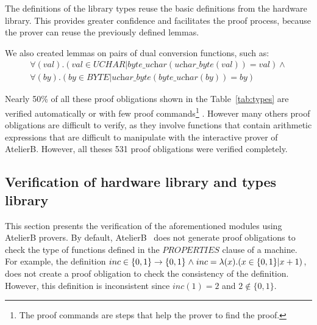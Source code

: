\documentclass[a4paper]{llncs}
\begin{document}
The definitions of the library types reuse the basic definitions from
the hardware library. This provides greater confidence and facilitates
the proof process, because the prover can reuse the previously defined
lemmas.


%

We also created lemmas on pairs of dual conversion functions, such as:
$$
 \begin{array}{l}
  \forall (val) . (val \in \textit{UCHAR} |
  \textit{byte\_uchar}(\textit{uchar\_byte}(val)) = val) \land\\
  \forall (by) . (by \in \textit{BYTE} |
  \textit{uchar\_byte}(\textit{byte\_uchar}(by)) = by)
 \end{array}
$$


Nearly 50\% of all these proof obligations shown in the
Table~\ref{tab:types} are verified automatically or with few proof
commands\footnote{The proof commands are steps that help the prover to find the proof.} .
However many others proof obligations are difficult to verify, as they involve functions
that contain arithmetic expressions that are difficult to manipulate with the interactive
prover of AtelierB. However, all theses 531 proof obligations were verified completely.


\subsection{Verification of hardware library and types library} 
\label{sec:VerificationHardwareLibrary}

This section presents the verification of the aforementioned modules
using AtelierB provers.  By default, AtelierB~\cite{atelierB} does not
generate proof obligations to check the type of functions defined in
the $PROPERTIES$ clause of a machine. For example, the definition $inc
\in \{0,1\} \fun \{0,1\} \land inc = \lambda(x).( x \in \{0,1\} | x +
1)$, does not create a proof obligation to check the consistency of
the definition. However, this definition is inconsistent since
$inc(1)=2$ and $ 2 \not\in \{0,1\}$.
\end{document}
